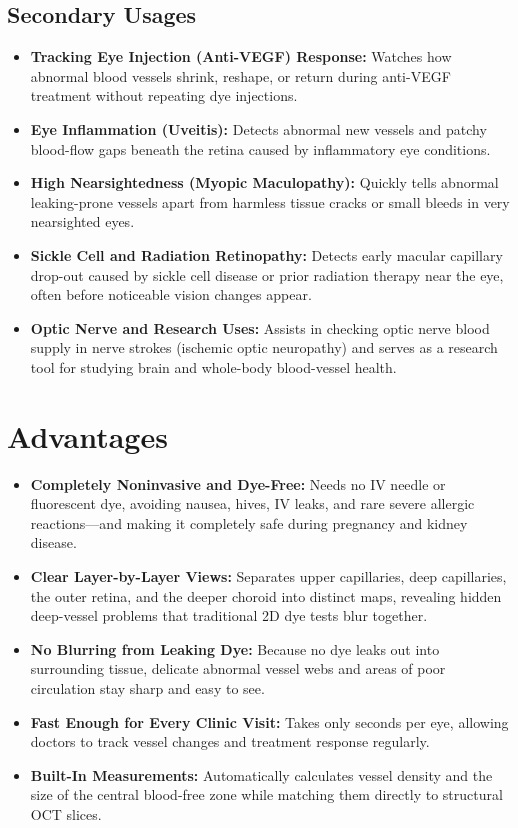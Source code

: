 \subsection{Secondary Usages}
\begin{itemize}
\item \textbf{Tracking Eye Injection (Anti-VEGF) Response:} Watches how abnormal blood vessels shrink, reshape, or return during anti-VEGF treatment without repeating dye injections.
\item \textbf{Eye Inflammation (Uveitis):} Detects abnormal new vessels and patchy blood-flow gaps beneath the retina caused by inflammatory eye conditions.
\item \textbf{High Nearsightedness (Myopic Maculopathy):} Quickly tells abnormal leaking-prone vessels apart from harmless tissue cracks or small bleeds in very nearsighted eyes.
\item \textbf{Sickle Cell and Radiation Retinopathy:} Detects early macular capillary drop-out caused by sickle cell disease or prior radiation therapy near the eye, often before noticeable vision changes appear.
\item \textbf{Optic Nerve and Research Uses:} Assists in checking optic nerve blood supply in nerve strokes (ischemic optic neuropathy) and serves as a research tool for studying brain and whole-body blood-vessel health.
\end{itemize}

\section{Advantages}
\begin{itemize}
\item \textbf{Completely Noninvasive and Dye-Free:} Needs no IV needle or fluorescent dye, avoiding nausea, hives, IV leaks, and rare severe allergic reactions---and making it completely safe during pregnancy and kidney disease.
\item \textbf{Clear Layer-by-Layer Views:} Separates upper capillaries, deep capillaries, the outer retina, and the deeper choroid into distinct maps, revealing hidden deep-vessel problems that traditional 2D dye tests blur together.
\item \textbf{No Blurring from Leaking Dye:} Because no dye leaks out into surrounding tissue, delicate abnormal vessel webs and areas of poor circulation stay sharp and easy to see.
\item \textbf{Fast Enough for Every Clinic Visit:} Takes only seconds per eye, allowing doctors to track vessel changes and treatment response regularly.
\item \textbf{Built-In Measurements:} Automatically calculates vessel density and the size of the central blood-free zone while matching them directly to structural OCT slices.
\end{itemize}

